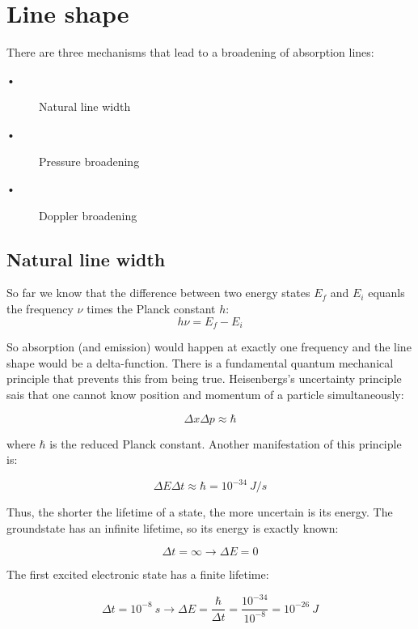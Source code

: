 \documentclass[a4paper,fleqn]{article}
\begin{document}
\section{Line shape}

There are three mechanisms that lead to a broadening of absorption lines:
\begin{description}
\item[•] Natural line width
\item[•] Pressure broadening
\item[•] Doppler broadening 
\end{description}

\subsection{Natural line width}

So far we know that the difference between two energy states $E_{f}$ and $E_{i}$ equanls the frequency $\nu$ times the Planck constant $h$:
\begin{equation}
h \nu = E_f - E_i
\end{equation}

So absorption (and emission) would happen at exactly one frequency and the line shape would be a delta-function. There is a fundamental quantum mechanical principle that prevents this from being true. Heisenbergs's uncertainty principle sais that one cannot know position and momentum of a particle simultaneously: 

\begin{equation}
\Delta x \Delta p \approx \hbar
\end{equation}

where $\hbar$ is the reduced Planck constant. Another manifestation of this principle is:

\begin{equation}
\Delta E \Delta t \approx \hbar = 10^{-34}~J/s
\end{equation}

Thus, the shorter the lifetime of a state, the more uncertain is its energy. 
The groundstate has an infinite lifetime, so its energy is exactly known:

\begin{equation}
\Delta t = \infty \rightarrow \Delta E = 0
\end{equation}

The first excited electronic state has a finite lifetime:

\begin{equation}
\Delta t = 10^{-8}~s \rightarrow \Delta E = \frac{\hbar}{\Delta t} = \frac{10^{-34}}{10^{-8}} = 10^{-26}~J
\end{equation}
\end{document}

